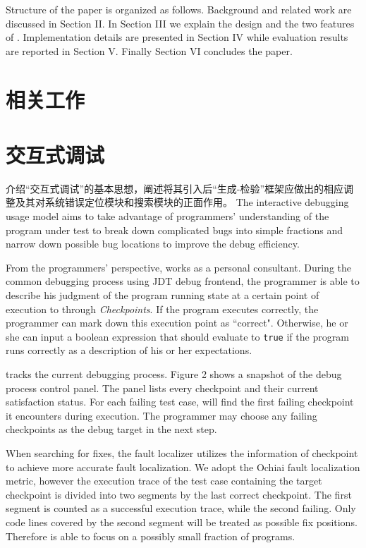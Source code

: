 Structure of the paper is organized as follows. Background and related work are discussed in Section II. In Section III we explain the design and the two features of \SmartDebug. Implementation details are presented in Section IV while evaluation results are reported in Section V. Finally Section VI concludes the paper.
\section{相关工作}%

\section{交互式调试}%
介绍“交互式调试”的基本思想，阐述将其引入后“生成-检验”框架应做出的相应调整及其对系统错误定位模块和搜索模块的正面作用。
The interactive debugging usage model aims to take advantage of programmers' understanding of the program under test to break down complicated bugs into simple fractions and narrow down possible bug locations to improve the debug efficiency.

From the programmers' perspective, \SmartDebug works as a personal consultant. During the common debugging process using JDT debug frontend, the programmer is able to describe his judgment of the program running state at a certain point of execution to \SmartDebug through \textit{Checkpoints}. If the program executes correctly, the programmer can mark down this execution point as ``correct". Otherwise, he or she can input a boolean expression that should evaluate to \texttt{true} if the program runs correctly as a description of his or her expectations.

\SmartDebug tracks the current debugging process. Figure 2 shows a snapshot of the debug process control panel. The panel lists every checkpoint and their current satisfaction status. For each failing test case, \SmartDebug will find the first failing checkpoint it encounters during execution. The programmer may choose any failing checkpoints as the debug target in the next step.

When searching for fixes, the fault localizer utilizes the information of checkpoint to achieve more accurate fault localization. We adopt the Ochiai\cite{Abreu:2006:ESC:1193217.1194368} fault localization metric, however the execution trace of the test case containing the target checkpoint is divided into two segments by the last correct checkpoint. The first segment is counted as a successful execution trace, while the second failing. Only code lines covered by the second segment will be treated as possible fix positions. Therefore \SmartDebug is able to focus on a possibly small fraction of programs.

